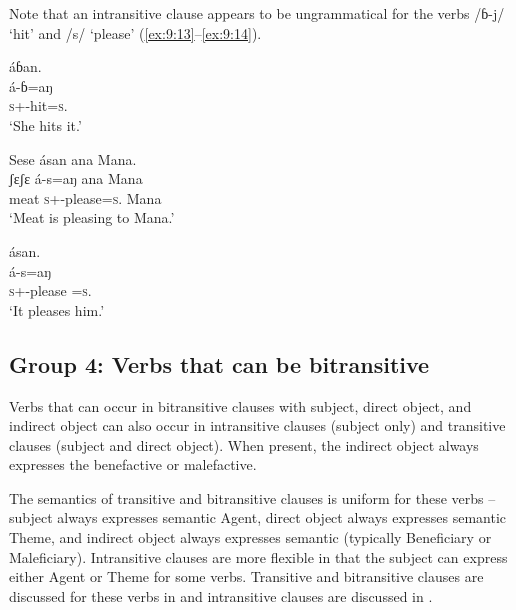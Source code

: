 Note that an intransitive clause appears to be ungrammatical for the verbs \newline/ɓ-j/ ‘hit’ and /s/ ‘please’ (\ref{ex:9:13}--\ref{ex:9:14}).

\ea \label{ex:9:13}

\medskip
\ex
{áɓan. \\
\gll  á-ɓ=aŋ\\
      \textsc{s}+{\IFV}-hit=\textsc{s}.{\IO}\\
\glt  ‘She hits it.’}
\z\z

\ea \label{ex:9:14}
\ea Sese ásan ana Mana. \\
\gll  ʃɛʃɛ  á-s=aŋ         ana   Mana\\
      meat    \textsc{s}+{\IFV}-please=\textsc{s}.{\IO}  {\DAT}  Mana\\
\glt  ‘Meat is pleasing to Mana.’

\medskip
\ex
{ásan. \\
\gll  á-s=aŋ\\
      \textsc{s}+{\IFV}-please =\textsc{s}.{\IO}\\
\glt  ‘It pleases him.’}
\z\z


\subsection{Group 4: Verbs that can be bitransitive}\label{sec:9.2.4}
\hypertarget{RefHeading1212721525720847}{}
Verbs that can occur in bitransitive clauses with subject, direct object, and indirect object can also occur in intransitive clauses (subject only) and transitive clauses (subject and direct object). When present, the indirect object always expresses the benefactive or malefactive. 

The semantics of transitive and bitransitive clauses is uniform for these verbs – subject always expresses semantic Agent, direct object always expresses semantic Theme, and indirect object always expresses semantic \LOC (typically Beneficiary or Maleficiary). Intransitive clauses are more flexible in that the subject can express either Agent or Theme for some verbs. Transitive and bitransitive clauses are discussed for these verbs in  and intransitive clauses are discussed in .

